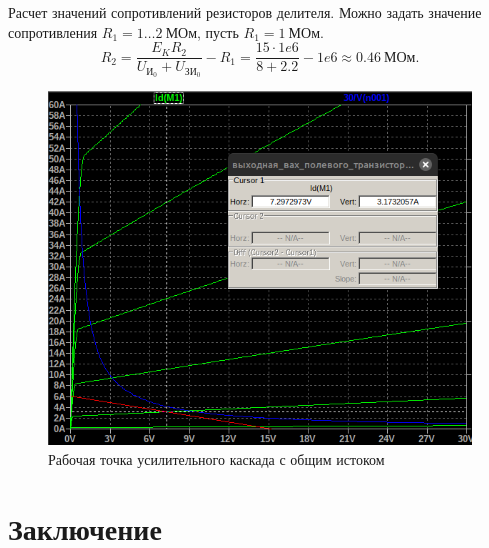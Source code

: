 Расчет значений сопротивлений резисторов делителя. Можно задать значение
сопротивления $R_1=1\dots 2\ \text{МОм}$, пусть $R_1=1\ \text{МОм}$. 
\begin{equation*}
    R_2=\frac{E_KR_2}{U_{\text{И}_0}+U_{\text{ЗИ}_0}}-R_1=\frac{15\cdot 1e6}{8+2.2}-1e6\approx0.46\ \text{МОм}.
\end{equation*}

\begin{figure}[H]
    \centering
    \includegraphics[width=0.8\linewidth]{figs/рабочая точка.png}
    \caption{Рабочая точка усилительного каскада с общим истоком}
    \label{fig:рабочая_точка}
\end{figure}



\section*{Заключение}



